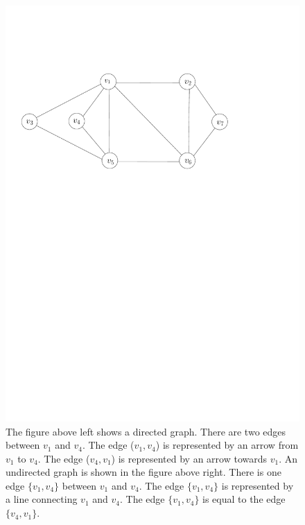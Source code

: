 \documentclass[12pt,a4paper,twoside]{scrartcl}
\numberwithin{equation}{section}
\begin{document}
\begin{figure}[h!]
\begin{minipage}[b]{0.49\textwidth}
  \end{minipage}
  \hfill
  \begin{minipage}[b]{0.49\textwidth}
\includegraphics[scale = 0.5]{1/basicGG.pdf}

  \end{minipage}
    \caption{The figure above left  shows a directed graph. There are two edges between $v_1$ and $v_4$. The edge ($v_1, v_4$) is represented by an arrow from $v_1$ to $v_4$. The edge ($v_4, v_1$) is represented by an arrow towards $v_1$. An undirected graph is shown in the figure above right. There is one edge $\{v_1, v_4\}$ between $v_1$ and $v_4$. The edge $\{v_1, v_4\}$ is represented by a line connecting $v_1$ and $v_4$. The edge $\{v_1, v_4\}$ is equal to the edge $\{v_4, v_1\}$.}
\end{figure}
\end{document}
